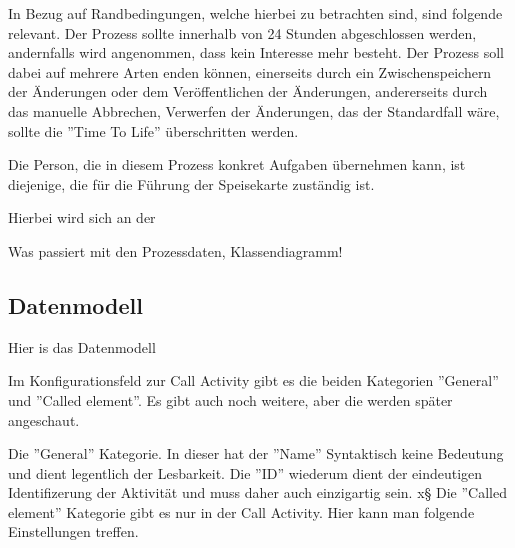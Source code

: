 In Bezug auf Randbedingungen, welche hierbei zu betrachten sind, sind folgende relevant. Der Prozess sollte innerhalb von 24 Stunden abgeschlossen werden, andernfalls wird angenommen, dass kein Interesse mehr besteht. Der Prozess soll dabei auf mehrere Arten enden können, einerseits durch ein Zwischenspeichern der Änderungen oder dem Veröffentlichen der Änderungen, andererseits durch das manuelle Abbrechen, Verwerfen der Änderungen, das der Standardfall wäre, sollte die ''Time To Life'' überschritten werden.

Die Person, die in diesem Prozess konkret Aufgaben übernehmen kann, ist diejenige, die für die Führung der Speisekarte zuständig ist.

\clearpage
{}

Hierbei wird sich an der 


Was passiert mit den Prozessdaten,  Klassendiagramm!


\subsection{Datenmodell}
\label{sec:datenmodell}
Hier is das Datenmodell


\clearpage
{}

Im Konfigurationsfeld zur Call Activity gibt es die beiden Kategorien ''General'' und ''Called element''. Es gibt auch noch weitere, aber die werden später angeschaut. 

Die ''General'' Kategorie. In dieser hat der ''Name'' Syntaktisch keine Bedeutung und dient legentlich der Lesbarkeit. Die ''ID'' wiederum dient der eindeutigen Identifizerung der Aktivität und muss daher auch einzigartig sein.
x§
Die ''Called element'' Kategorie gibt es nur in der Call Activity. Hier kann man folgende Einstellungen treffen.

